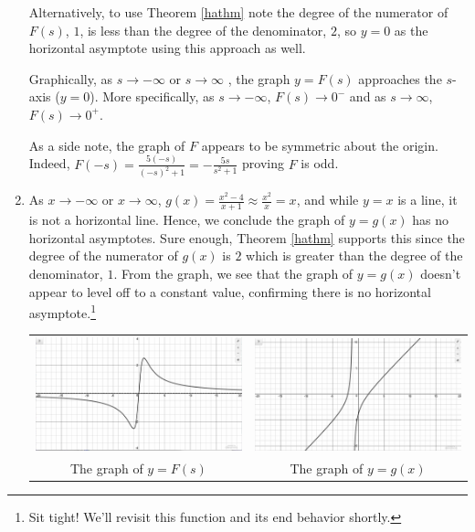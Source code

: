 \begin{ex}
\begin{enumerate}
Alternatively, to use Theorem \ref{hathm} note the degree of the numerator of  $F(s)$,  $1$, is less than the degree of the denominator, $2$,  so  $y=0$ as the horizontal asymptote using this approach as well.

Graphically, as $s \rightarrow  -\infty$ or $s \rightarrow  \infty$ , the graph $y = F(s)$ approaches the $s$-axis ($y = 0$).  More specifically, as $s \rightarrow -\infty$, $F(s)  \rightarrow 0^{-}$ and as $s \rightarrow \infty$, $F(s)  \rightarrow 0^{+}$.  

As a side note, the graph of $F$ appears to be symmetric about the origin.  Indeed, $F(-s) = \frac{5(-s)}{(-s)^2+1} = -\frac{5s}{s^2+1}$ proving $F$ is odd.

\item  As $x \rightarrow  -\infty$ or $x \rightarrow \infty$, $g(x) = \frac{x^2-4}{x+1} \approx \frac{x^2}{x} = x$, and while $y = x$ is a line, it is not a horizontal line.  Hence, we conclude the graph of $y = g(x)$ has no horizontal asymptotes.  Sure enough,  Theorem \ref{hathm} supports this since the degree of the numerator of $g(x)$ is $2$ which is greater than the degree of the denominator, $1$.   From the graph, we see that the graph of $y=g(x)$ doesn't appear to level off to a constant value, confirming there is no horizontal asymptote.\footnote{Sit tight!  We'll revisit this function and its end behavior shortly.}

\begin{center}
\begin{tabular}{cc}

\includegraphics[width=3in]{./IntroRationalGraphics/HAEx01.jpg}  & \includegraphics[width=3in]{./IntroRationalGraphics/HAEx02.jpg} \\
The graph of $y=F(s)$  & The graph of $y=g(x)$ \\



\end{tabular}
\end{center}
\end{enumerate}
\end{ex}
